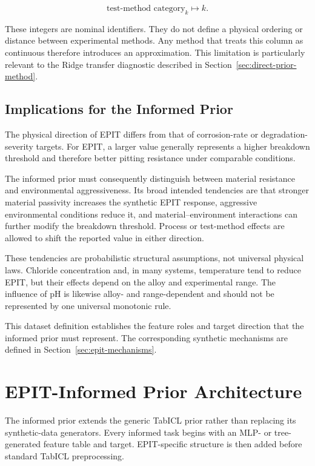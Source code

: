 \documentclass{article}
\begin{document}
\[
\text{test-method category}_k \longmapsto k.
\]

These integers are nominal identifiers. They do not define a physical ordering or distance between experimental methods. Any method that treats this column as continuous therefore introduces an approximation. This limitation is particularly relevant to the Ridge transfer diagnostic described in Section~\ref{sec:direct-prior-method}.

\subsection{Implications for the Informed Prior}

The physical direction of EPIT differs from that of corrosion-rate or degradation-severity targets. For EPIT, a larger value generally represents a higher breakdown threshold and therefore better pitting resistance under comparable conditions.

The informed prior must consequently distinguish between material resistance and environmental aggressiveness. Its broad intended tendencies are that stronger material passivity increases the synthetic EPIT response, aggressive environmental conditions reduce it, and material--environment interactions can further modify the breakdown threshold. Process or test-method effects are allowed to shift the reported value in either direction.

These tendencies are probabilistic structural assumptions, not universal physical laws. Chloride concentration and, in many systems, temperature tend to reduce EPIT, but their effects depend on the alloy and experimental range. The influence of pH is likewise alloy- and range-dependent and should not be represented by one universal monotonic rule.

This dataset definition establishes the feature roles and target direction that the informed prior must represent. The corresponding synthetic mechanisms are defined in Section~\ref{sec:epit-mechanisms}.


\section{EPIT-Informed Prior Architecture}
\label{sec:informed-architecture}

The informed prior extends the generic TabICL prior rather than replacing its synthetic-data generators. Every informed task begins with an MLP- or tree-generated feature table and target. EPIT-specific structure is then added before standard TabICL preprocessing.
\end{document}
